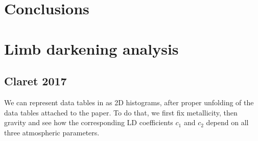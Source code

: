 \documentclass[a4paper,11pt,twocolumn]{article}
\begin{document}
\section{Conclusions}















\appendix
\section{Limb darkening analysis}
\label{sect:app_A}

\subsection{Claret 2017}
We can represent data tables in \cite{claret2017} as 2D histograms, 
after proper unfolding of the data tables attached to the paper. To do that, 
we first fix metallicity, then gravity and see how the corresponding LD 
coefficients $c_1$ and $c_2$ depend on all three atmospheric parameters. 
\end{document}
